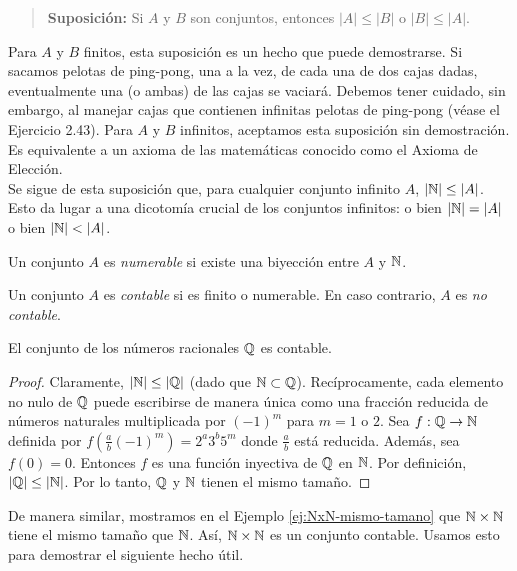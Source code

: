 \message{ !name(main.tex)}\documentclass[12pt,a4paper]{book}
\begin{document}
    \begin{quote}
        \textbf{Suposición:} Si $A$ y $B$ son conjuntos, entonces $|A|\leq|B|$ o $|B|\leq|A|$.
    \end{quote}

    Para $A$ y $B$ finitos, esta suposición es un hecho que puede demostrarse. Si sacamos pelotas de ping-pong, una a la
    vez, de cada una de dos cajas dadas, eventualmente una (o ambas) de las cajas se vaciará. Debemos tener cuidado, sin
    embargo, al manejar cajas que contienen infinitas pelotas de ping-pong (véase el Ejercicio 2.43). Para $A$ y $B$
    infinitos, aceptamos esta suposición sin demostración. Es equivalente a un axioma de las matemáticas conocido como el
    Axioma de Elección.\\
    Se sigue de esta suposición que, para cualquier conjunto infinito $A$, $|\mathbb{N}|\leq|A|$. Esto da lugar a una dicotomía
    crucial de los conjuntos infinitos: o bien $|\mathbb{N}|=|A|$ o bien $|\N|<|A|$.

    \begin{definicion}\label{def:numerable}
        Un conjunto $A$ es \textit{numerable} si existe una biyección entre $A$ y $\mathbb{N}$.
    \end{definicion}

    \begin{definicion}\label{def:contable}
        Un conjunto $A$ es \textit{contable} si es finito o numerable. En caso contrario, $A$ es \textit{no contable}.
    \end{definicion}

    \begin{proposicion}\label{prop:Q-contable}
        El conjunto de los números racionales $\mathbb{Q}$ es contable.
    \end{proposicion}
    \begin{proof}
        Claramente, $|\mathbb{N}|\leq|\mathbb{Q}|$ (dado que $\mathbb{N}\subset\mathbb{Q}$). Recíprocamente, cada elemento no nulo de $\mathbb{Q}$ puede escribirse
        de manera única como una fracción reducida de números naturales multiplicada por $(-1)^{m}$ para $m=1$ o $2$. Sea
        $f:\mathbb{Q}\rightarrow\mathbb{N}$ definida por $f\left(\frac{a}{b}(-1)^{m}\right)=2^{a}3^{b}5^{m}$ donde $\frac{a}{b}$ está
        reducida. Además, sea $f(0)=0$. Entonces $f$ es una función inyectiva de $\mathbb{Q}$ en $\mathbb{N}$. Por definición,
        $|\mathbb{Q}|\leq|\mathbb{N}|$. Por lo tanto, $\mathbb{Q}$ y $\mathbb{N}$ tienen el mismo tamaño.
    \end{proof}

    De manera similar, mostramos en el Ejemplo \ref{ej:NxN-mismo-tamano} que $\mathbb{N}\times\mathbb{N}$ tiene el mismo tamaño que $\mathbb{N}$.
    Así, $\mathbb{N}\times\mathbb{N}$ es un conjunto contable. Usamos esto para demostrar el siguiente hecho útil.
\end{document}
